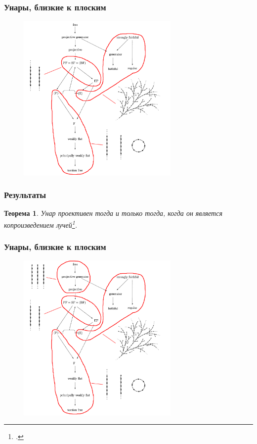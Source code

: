 \documentclass[11pt, notheorems]{beamer}
\newtheorem{theorem}{Теорема}
\begin{document}
\begin{frame}
	\frametitle{Унары, близкие к плоским}

	\begin{figure}
		\center
		\includegraphics[width=0.7\textwidth]{overview_5.png}
	\end{figure}
\end{frame}

\begin{frame}
	\frametitle{Результаты}

	\begin{theorem}
		Унар проективен тогда и только тогда, когда он является копроизведением лучей\footcite[теорема 1]{sahar}.
	\end{theorem}
\end{frame}

\begin{frame}
	\frametitle{Унары, близкие к плоским}

	\begin{figure}
		\center
		\includegraphics[width=0.7\textwidth]{overview_6.png}
	\end{figure}
\end{frame}
\end{document}
